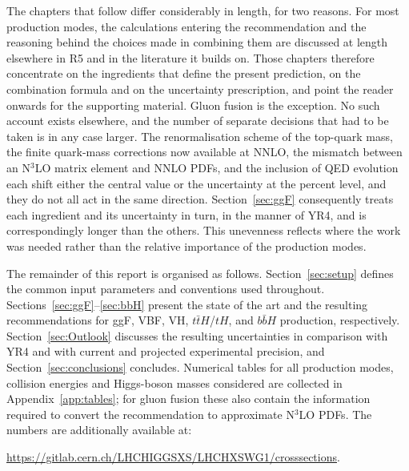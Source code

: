 The chapters that follow differ considerably in length, for two
reasons. For most production modes, the calculations entering the
recommendation and the reasoning behind the choices made in combining
them are discussed at length elsewhere in R5 and in the literature it
builds on. Those chapters therefore concentrate on the ingredients
that define the present prediction, on the combination formula and on
the uncertainty prescription, and point the reader onwards for the
supporting material. Gluon fusion is the exception. No such account
exists elsewhere, and the number of separate decisions that had to be
taken is in any case larger. The renormalisation scheme of the
top-quark mass, the finite quark-mass corrections now available at
NNLO, the mismatch between an N$^3$LO matrix element and NNLO PDFs,
and the inclusion of QED evolution each shift either the central value
or the uncertainty at the percent level, and they do not all act in
the same direction. Section~\ref{sec:ggF} consequently treats each
ingredient and its uncertainty in turn, in the manner of YR4, and is
correspondingly longer than the others. This unevenness reflects where
the work was needed rather than the relative importance of the
production modes.

The remainder of this report is organised as
follows. Section~\ref{sec:setup} defines the common input parameters
and conventions used throughout. Sections~\ref{sec:ggF}--\ref{sec:bbH}
present the state of the art and the resulting recommendations for
ggF, VBF, VH, $t\bar t H$/$tH$, and $b\bar b H$ production,
respectively. Section~\ref{sec:Outlook} discusses the resulting
uncertainties in comparison with YR4 and with current and projected
experimental precision, and Section~\ref{sec:conclusions}
concludes. Numerical tables for all production modes, collision
energies and Higgs-boson masses considered are collected in
Appendix~\ref{app:tables}; for gluon fusion these also contain the
information required to convert the recommendation to approximate
N$^3$LO PDFs. The numbers are additionally available at:
\begin{center}\url{https://gitlab.cern.ch/LHCHIGGSXS/LHCHXSWG1/crosssections}.\end{center}
